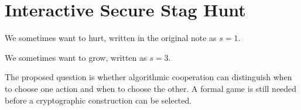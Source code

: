 \chapter{Interactive Secure Stag Hunt}
\label{chap:interactive-stag-hunt}


We sometimes want to hurt, written in the original note as \(s=1\).

We sometimes want to grow, written as \(s=3\).

The proposed question is whether algorithmic cooperation can distinguish when
to choose one action and when to choose the other. A formal game is still
needed before a cryptographic construction can be selected.
